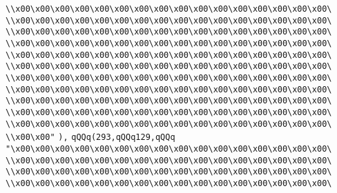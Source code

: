 \verb|\\x00\x00\x00\x00\x00\x00\x00\x00\x00\x00\x00\x00\x00\x00\x00\x00\|\newline
\verb|\\x00\x00\x00\x00\x00\x00\x00\x00\x00\x00\x00\x00\x00\x00\x00\x00\|\newline
\verb|\\x00\x00\x00\x00\x00\x00\x00\x00\x00\x00\x00\x00\x00\x00\x00\x00\|\newline
\verb|\\x00\x00\x00\x00\x00\x00\x00\x00\x00\x00\x00\x00\x00\x00\x00\x00\|\newline
\verb|\\x00\x00\x00\x00\x00\x00\x00\x00\x00\x00\x00\x00\x00\x00\x00\x00\|\newline
\verb|\\x00\x00\x00\x00\x00\x00\x00\x00\x00\x00\x00\x00\x00\x00\x00\x00\|\newline
\verb|\\x00\x00\x00\x00\x00\x00\x00\x00\x00\x00\x00\x00\x00\x00\x00\x00\|\newline
\verb|\\x00\x00\x00\x00\x00\x00\x00\x00\x00\x00\x00\x00\x00\x00\x00\x00\|\newline
\verb|\\x00\x00\x00\x00\x00\x00\x00\x00\x00\x00\x00\x00\x00\x00\x00\x00\|\newline
\verb|\\x00\x00\x00\x00\x00\x00\x00\x00\x00\x00\x00\x00\x00\x00\x00\x00\|\newline
\verb|\\x00\x00\x00\x00\x00\x00\x00\x00\x00\x00\x00\x00\x00\x00\x00\x00\|\newline
\verb|\\x00\x00"|\newline
\verb|),|\newline
\verb|qQQq(293,qQQq129,qQQq|\newline
\verb|"\x00\x00\x00\x00\x00\x00\x00\x00\x00\x00\x00\x00\x00\x00\x00\x00\|\newline
\verb|\\x00\x00\x00\x00\x00\x00\x00\x00\x00\x00\x00\x00\x00\x00\x00\x00\|\newline
\verb|\\x00\x00\x00\x00\x00\x00\x00\x00\x00\x00\x00\x00\x00\x00\x00\x00\|\newline
\verb|\\x00\x00\x00\x00\x00\x00\x00\x00\x00\x00\x00\x00\x00\x00\x00\x00\|\newline
